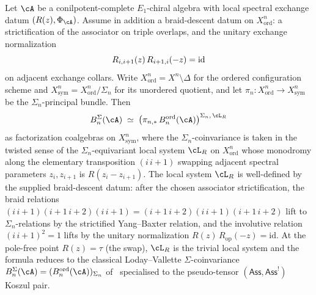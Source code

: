 \begin{proposition}
\label{prop:R-twisted-sigma-n-descent}
Let $\cA$ be a conilpotent-complete $E_1$-chiral algebra with
local spectral exchange datum \((R(z),\Phi_\cA)\).  Assume in addition
a braid-descent datum on \(X^n_{\mathrm{ord}}\): a strictification of
the associator on triple overlaps, and the unitary exchange
normalization
\[
 R_{i,i+1}(z)\,R_{i+1,i}(-z)=\mathrm{id}
\]
on adjacent exchange collars.
Write $X^n_{\mathrm{ord}} = X^n \setminus \Delta$ for the ordered
configuration scheme and $X^n_{\mathrm{sym}} =
X^n_{\mathrm{ord}}/\Sigma_n$ for its unordered quotient, and let
$\pi_n \colon X^n_{\mathrm{ord}} \to X^n_{\mathrm{sym}}$ be the
$\Sigma_n$-principal bundle. Then
\[
 B^{\Sigma}_n(\cA)
 \;\simeq\;
 \bigl(\pi_{n,*}\,B^{\mathrm{ord}}_n(\cA)\bigr)^{\Sigma_n,\,\cL_R}
\]
as factorization coalgebras on $X^n_{\mathrm{sym}}$, where the
$\Sigma_n$-coinvariance is taken in the twisted sense of the
$\Sigma_n$-equivariant local system $\cL_R$ on
$X^n_{\mathrm{ord}}$ whose monodromy along the elementary
transposition $(i\,i{+}1)$ swapping adjacent spectral parameters
$z_i, z_{i+1}$ is $R(z_i - z_{i+1})$. The local system $\cL_R$ is
well-defined by the supplied braid-descent datum: after the chosen
associator strictification, the braid relations
$(i\,i{+}1)(i{+}1\,i{+}2)(i\,i{+}1)
 = (i{+}1\,i{+}2)(i\,i{+}1)(i{+}1\,i{+}2)$
lift to $\Sigma_n$-relations by the strictified Yang--Baxter relation,
and the involutive relation
$(i\,i{+}1)^2 = 1$ lifts by the unitary normalization
$R(z)\,R_{\mathrm{op}}(-z) = \mathrm{id}$. At the pole-free point
$R(z) = \tau$ (the swap), $\cL_R$ is the trivial local system and
the formula reduces to the classical Loday--Vallette
$\Sigma$-coinvariance
$B^{\Sigma}_n(\cA) = (B^{\mathrm{ord}}_n(\cA))_{\Sigma_n}$
of~\cite{LV12} specialised to the pseudo-tensor
$(\mathsf{Ass}, \mathsf{Ass}^!)$ Koszul pair.
\end{proposition}
